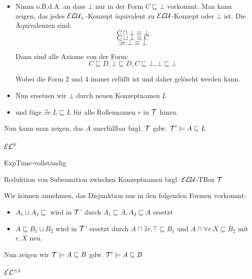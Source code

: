 \begin{itemize}
\item Nimm o.B.d.A. an dass $\bot$ nur in der Form $C \sqsubseteq \bot$ vorkommt. Man kann zeigen, das jedes $\mathcal{E}\mathcal{L}\mathcal{U}_{\bot}$-Konzept äquivalent zu $\mathcal{E}\mathcal{L}\mathcal{U}$-Konzept oder $\bot$ ist. Die Äquivalenzen sind:
$$C \sqcap \bot \equiv \bot$$
$$C \sqcup \bot \equiv C$$
$$\exists r.\bot \equiv \bot$$

Dann sind alle Axiome von der Form:
$$C\sqsubseteq D, \bot \sqsubseteq D, C \sqsubseteq \bot, \bot \sqsubseteq \bot$$

Wobei die Form 2 und 4 immer erfüllt ist und daher gelöscht werden kann.


\item Nun ersetzen wir $\bot$ durch neuen Konzeptnamen $L$

\item und füge $\exists r.L \sqsubseteq L$ für alle Rollennamen $r$ in $\mathcal{T}$ hinzu.
\end{itemize}

Nun kann man zeigen, das $A$ unerfüllbar bzgl. $\mathcal{T}$ gdw. $\mathcal{T} ' \models A \sqsubseteq L$

\paragraph{\texorpdfstring{$\mathcal{E}\mathcal{L}^{\forall}$}{EL}}

ExpTime-vollständig

Reduktion von Subsumition zwischen Konzeptnamen bzgl. $\mathcal{E}\mathcal{L}\mathcal{U}$-TBox $\mathcal{T}$

Wir können annehmen, das Disjunktion nur in den folgenden Formen vorkommt:

\begin{itemize}
	\item $A_1 \sqcup A_2 \sqsubseteq$ wird in $\mathcal{T}$' durch $A_1 \sqsubseteq A, A_2 \sqsubseteq A$ ersetzt
	\item $A \sqsubseteq B_1 \sqcup B_2$ wird in $\mathcal{T}$' ersetzt durch $A \sqcap \exists r.\top \sqsubseteq B_1$ und $A \sqcap \forall r.X \sqsubseteq B_2$ mit $r,X$ neu.
\end{itemize}

Nun zeigen wir $\mathcal{T} \models A \sqsubseteq B$ gdw. $\mathcal{T}' \models A \sqsubseteq B$

\paragraph{\texorpdfstring{$\mathcal{E}\mathcal{L}^{\leq 2}$}{EL}}

